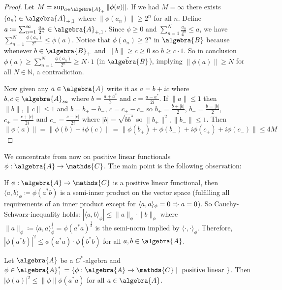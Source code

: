 \documentclass[a4paper]{article}
\begin{document}
\begin{proof}
	Let $M = \sup_{a \in \algebra{A}_+} \|\phi(a)\|$. 
	If we had $M = \infty$ there exists $(a_n) \in \algebra{A}_{+,1}$ where $\|\phi(a_n)\| \geq 2^n$ for all $n$. 
	Define $a \coloneq \sum_{n=1}^{\infty} \frac{a_n}{2^n} \in \algebra{A}_{+,1}$.
	Since $\phi \geq 0$ and $\sum_{n = 1}^{N} \frac{a_n}{2^n} \leq a$, we have $\sum_{n=1}^{N} \frac{\phi(a_n)}{2^n} \leq \phi(a)$.
	Notice that $\phi(a_n) \geq 2^n$ in $\tilde{\algebra{B}}$ because whenever $b \in \algebra{B}_+$ and $\|b\| \geq c \geq 0$ so $b \geq c \cdot 1$.
	So in conclusion $\phi(a) \geq \sum_{n = 1}^{N} \frac{\phi(a_n)}{2^n} \geq N \cdot 1$ (in $\tilde{\algebra{B}}$), implying $\|\phi(a)\| \geq N$ for all $N \in \mathds{N}$, a contradiction.

	Now given any $a \in \algebra{A}$ write it as $a = b + ic$ where $b,c \in \algebra{A}_{sa}$ where $b = \frac{a + a^*}{2}$ and $c = \frac{a - a^*}{2i}$.
	If $\|a\| \leq 1$ then $\|b\|, \|c\| \leq 1$ and $b = b_+ - b_-$, $c = c_+ - c_-$ so $b_+ = \frac{b + |b|}{2}$, $b_- = \frac{b = |b|}{2}$, $c_+ = \frac{c + |c|}{2i}$ and $c_- = \frac{c - |c|}{2i}$ where $|b| = \sqrt{b b^*}$ so $\|b_+\|^2, \|b_-\| \leq 1$. Then
	\begin{equation*}
		\|\phi(a) \| = \|\phi(b) + i \phi(c)\| = \|\phi(b_+) + \phi(b_-) + i \phi(c_+) + i \phi(c_-)\| \leq 4 M
	\end{equation*} 
\end{proof}

We concentrate from now on positive linear functionals $\phi: \algebra{A} \to \mathds{C}$. 
The main point is the following observation:

\begin{remark}
	If $\phi: \algebra{A} \to \mathds{C}$ is a positive linear functional, then $\langle a, b \rangle_{\phi} \coloneq \phi(a^* b)$ is a semi-inner product on the vector space (fulfilling all requirements of an inner product except for $\langle a, a \rangle_\phi = 0 \then a = 0$).
	So Cauchy-Schwarz-inequality holds: $|\langle a, b \rangle_\phi| \leq \|a\|_\phi \cdot \|b\|_\phi$ where $\|a\|_\phi \coloneq \langle a, a \rangle_\phi^\frac{1}{2} = \phi(a^* a)^\frac{1}{2}$ is the semi-norm implied by $\langle \cdot, \cdot \rangle_\phi$.
	Therefore, $|\phi(a^* b)|^2 \leq \phi(a^* a) \cdot \phi(b^* b)$ for all $a, b \in \algebra{A}$.
\end{remark}

\begin{proposition}
	Let $\algebra{A}$ be a $C^*$-algebra and $\phi \in \algebra{A}_+^* = \{ \phi: \algebra{A} \to \mathds{C} \mid  \text{ positive linear } \}$.
	Then $|\phi(a)|^2 \leq \|\phi\| \phi(a^* a)$ for all $a \in \algebra{A}$.
\end{proposition}
\end{document}
